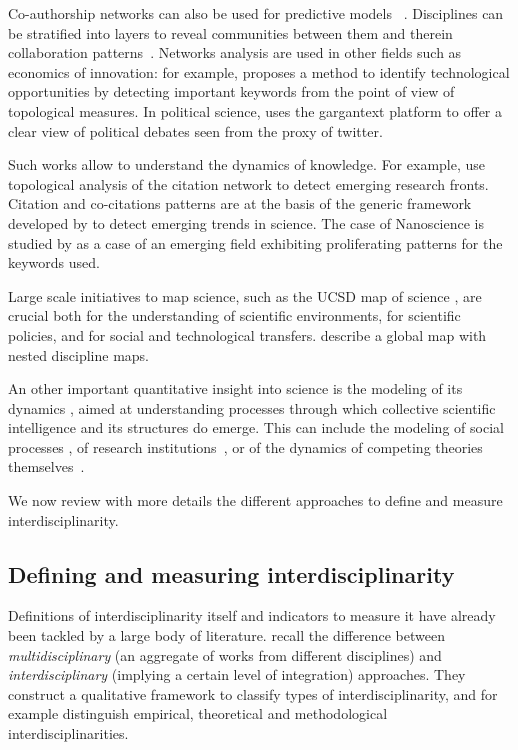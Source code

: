 \documentclass[10pt]{article}
\begin{document}
Co-authorship networks can also be used for predictive models ~\citep{2014arXiv1402.7268S}. Disciplines can be stratified into layers to reveal communities between them and therein collaboration patterns~\citep{2015arXiv150601280B}. Networks analysis are used in other fields such as economics of innovation: for example, \cite{choi2014patent} proposes a method to identify technological opportunities by detecting important keywords from the point of view of topological measures. In political science, \cite{gaumont2017methods} uses the gargantext platform to offer a clear view of political debates seen from the proxy of twitter.

Such works allow to understand the dynamics of knowledge. For example, \cite{shibata2008detecting} use topological analysis of the citation network to detect emerging research fronts. Citation and co-citations patterns are at the basis of the generic framework developed by \cite{chen2006citespace} to detect emerging trends in science. The case of Nanoscience is studied by \cite{bonaccorsi2010proliferation} as a case of an emerging field exhibiting proliferating patterns for the keywords used.

Large scale initiatives to map science, such as the UCSD map of science \citep{borner2012design}, are crucial both for the understanding of scientific environments, for scientific policies, and for social and technological transfers. \cite{leydesdorff2009global} describe a global map with nested discipline maps.

An other important quantitative insight into science is the modeling of its dynamics \citep{borner2011modeling,scharnhorst2012models}, aimed at understanding processes through which collective scientific intelligence and its structures do emerge. This can include the modeling of social processes \citep{edmonds2011simulating}, of research institutions~\citep{Rouse12582}, or of the dynamics of competing theories themselves~\citep{Akerlof13228}.


We now review with more details the different approaches to define and measure interdisciplinarity.


\subsection*{Defining and measuring interdisciplinarity}

Definitions of interdisciplinarity itself and indicators to measure it have already been tackled by a large body of literature. \cite{huutoniemi2010analyzing} recall the difference between \emph{multidisciplinary} (an aggregate of works from different disciplines) and \emph{interdisciplinary} (implying a certain level of integration) approaches. They construct a qualitative framework to classify types of interdisciplinarity, and for example distinguish empirical, theoretical and methodological interdisciplinarities.
\end{document}
